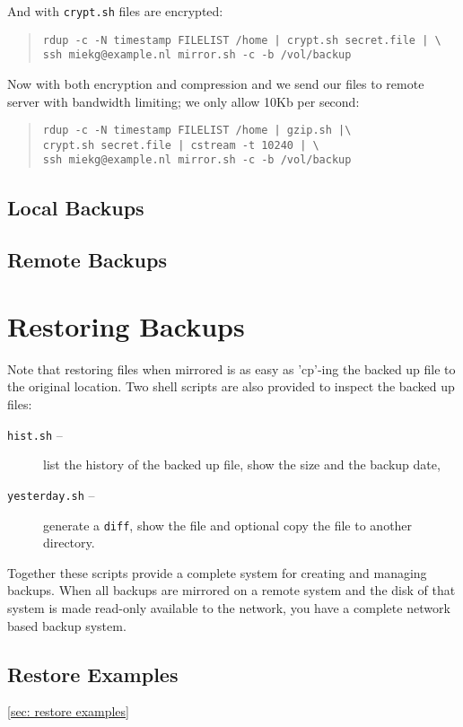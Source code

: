 \documentclass[a4paper, openany]{memoir}
\newcommand{\cmd}[1]{\texttt{#1}}
\begin{document}
\noindent And with \cmd{crypt.sh} files are encrypted:
\begin{quote}
\begin{verbatim}
rdup -c -N timestamp FILELIST /home | crypt.sh secret.file | \
ssh miekg@example.nl mirror.sh -c -b /vol/backup
\end{verbatim}
\end{quote}

\noindent Now with both encryption and compression and we 
send our files to remote server with bandwidth limiting; we
only allow 10Kb per second:
\begin{quote}
\begin{verbatim}
rdup -c -N timestamp FILELIST /home | gzip.sh |\
crypt.sh secret.file | cstream -t 10240 | \
ssh miekg@example.nl mirror.sh -c -b /vol/backup
\end{verbatim}
\end{quote}

\section{Local Backups}


\section{Remote Backups}


\chapter{Restoring Backups}

Note that restoring files when mirrored is as easy as 'cp'-ing the
backed up file to the original location. Two shell scripts are
also provided to inspect the backed up files:
\begin{description}
        \item[\cmd{hist.sh} --]{
                list the history of the backed up file, show the size
                and the backup date,}
        \item[\cmd{yesterday.sh} --]{
                generate a \cmd{diff}, show the file and optional copy 
                the file to another directory.}
\end{description}

Together these scripts provide a complete system
for creating and managing backups. When all backups are mirrored on a
remote system and the disk of that system is made read-only available to
the network, you have a complete network based backup system.

\section{Restore Examples}
\ref{sec: restore examples}
\end{document}
